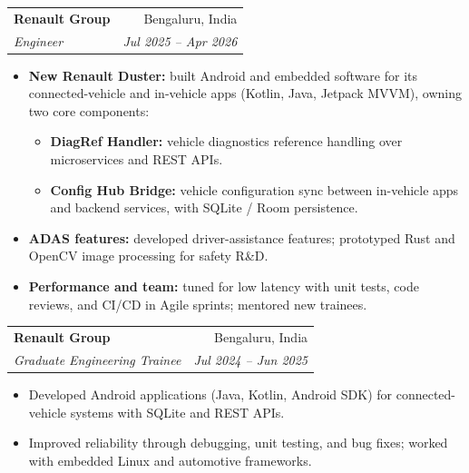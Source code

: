 \documentclass[letterpaper,10pt]{article}
\makeatletter
\newcommand{\resumeEntry}[4]{
  \vspace{2pt}
  \begin{tabularx}{\textwidth}{@{}X r@{}}
    \textbf{#1} & #2 \\
    \textit{#3} & \textit{#4} \\
  \end{tabularx}
  \vspace{-6pt}
}
\makeatother
\begin{document}
\resumeEntry{Renault Group}{Bengaluru, India}
  {Engineer}{Jul 2025 -- Apr 2026}
\begin{itemize}
  \item \textbf{New Renault Duster:} built Android and embedded software for its connected-vehicle and
        in-vehicle apps (Kotlin, Java, Jetpack MVVM), owning two core components:
        \begin{itemize}[label=$\circ$, topsep=1pt]
          \item \textbf{DiagRef Handler:} vehicle diagnostics reference handling over microservices and REST APIs.
          \item \textbf{Config Hub Bridge:} vehicle configuration sync between in-vehicle apps and backend
                services, with SQLite / Room persistence.
        \end{itemize}
  \item \textbf{ADAS features:} developed driver-assistance features; prototyped Rust and OpenCV image
        processing for safety R\&D.
  \item \textbf{Performance and team:} tuned for low latency with unit tests, code reviews, and CI/CD in
        Agile sprints; mentored new trainees.
\end{itemize}

\resumeEntry{Renault Group}{Bengaluru, India}
  {Graduate Engineering Trainee}{Jul 2024 -- Jun 2025}
\begin{itemize}
  \item Developed Android applications (Java, Kotlin, Android SDK) for connected-vehicle systems with
        SQLite and REST APIs.
  \item Improved reliability through debugging, unit testing, and bug fixes; worked with embedded Linux
        and automotive frameworks.
\end{itemize}

\end{document}
